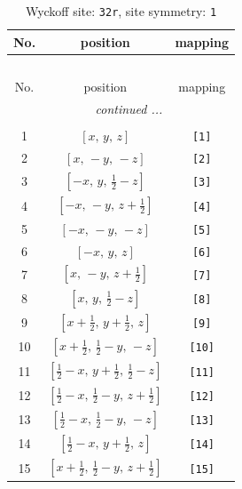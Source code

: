\documentclass[fleqn,8pt]{jsarticle}
\begin{document}
\renewcommand{\arraystretch}{1.2}
\begin{longtable}{ccc}
\caption{Wyckoff site: {\tt 32r}, site symmetry: {\tt 1}}
 \\
 \hline \hline
No. & position & mapping \\ \hline \endfirsthead

\multicolumn{2}{l}{\tablename\ \thetable{}} \\
 \hline \hline
No. & position & mapping \\ \hline \endhead

 \hline \hline
\multicolumn{2}{r}{\footnotesize\it continued ...} \\ \endfoot

 \hline \hline
\multicolumn{2}{r}{} \\ \endlastfoot

1 & $\left[ x,\, y,\, z \right]$ & {\tt [1]} \\ \hline
2 & $\left[ x,\, - y,\, - z \right]$ & {\tt [2]} \\ \hline
3 & $\left[ - x,\, y,\, \frac{1}{2} - z \right]$ & {\tt [3]} \\ \hline
4 & $\left[ - x,\, - y,\, z + \frac{1}{2} \right]$ & {\tt [4]} \\ \hline
5 & $\left[ - x,\, - y,\, - z \right]$ & {\tt [5]} \\ \hline
6 & $\left[ - x,\, y,\, z \right]$ & {\tt [6]} \\ \hline
7 & $\left[ x,\, - y,\, z + \frac{1}{2} \right]$ & {\tt [7]} \\ \hline
8 & $\left[ x,\, y,\, \frac{1}{2} - z \right]$ & {\tt [8]} \\ \hline
9 & $\left[ x + \frac{1}{2},\, y + \frac{1}{2},\, z \right]$ & {\tt [9]} \\ \hline
10 & $\left[ x + \frac{1}{2},\, \frac{1}{2} - y,\, - z \right]$ & {\tt [10]} \\ \hline
11 & $\left[ \frac{1}{2} - x,\, y + \frac{1}{2},\, \frac{1}{2} - z \right]$ & {\tt [11]} \\ \hline
12 & $\left[ \frac{1}{2} - x,\, \frac{1}{2} - y,\, z + \frac{1}{2} \right]$ & {\tt [12]} \\ \hline
13 & $\left[ \frac{1}{2} - x,\, \frac{1}{2} - y,\, - z \right]$ & {\tt [13]} \\ \hline
14 & $\left[ \frac{1}{2} - x,\, y + \frac{1}{2},\, z \right]$ & {\tt [14]} \\ \hline
15 & $\left[ x + \frac{1}{2},\, \frac{1}{2} - y,\, z + \frac{1}{2} \right]$ & {\tt [15]} \\ \hline

\end{longtable}
\end{document}

